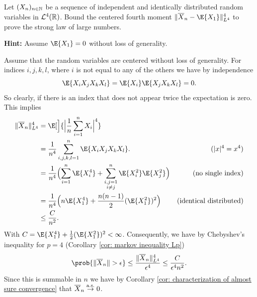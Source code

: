 
\begin{exercise}[subtitle={Strong law of large numbers in \(L^4\) \Coffeecup\Coffeecup}]
    \label{ex: strong law of large numbers in L4}
    Let \((X_n)_{n\in \mathbb{N}}\) be a sequence of independent and identically
    distributed random variables in \(\mathcal{L}^4(\mathbb{R})\). Bound the centered fourth moment
    \(\|\mean{X}_n - \E{X_1}\|_{L^4}^4\) to prove the strong law of large numbers.

    \noindent\textbf{Hint:} Assume \(\E{X_1} = 0\) without loss of generality.
\end{exercise}

\begin{solution}
    Assume that the random variables are centered without loss of generality.
    For indices \(i,j,k,l\), where \(i\) is not equal to any of the others
    we have by independence
    \[
        \E{X_i X_j X_k X_l} = \E{X_i}\E{X_jX_k X_l} = 0.
    \]
    So clearly, if there is an index that does not appear twice the expectation is zero.
    This implies
    \[\begin{aligned}
        \norm{\mean{X}_n}_{L^4}^4
        &= \E[\Big]{\abs[\Big]{\frac1n \sum_{i=1}^n X_i}^4}
        \\
        &= \frac1{n^4} \sum_{i,j,k,l=1}^n \E{X_i X_j X_k X_l}.
        & (\abs{x}^4=x^4)
        \\
        &= \frac1{n^4} \Bigl(
            \sum_{i=1}^n \E{X_i^4}
            + \sum_{\substack{i,j=1\\i\neq j}}^n \E{X_i^2}\E{X_j^2}
        \Bigr)
        & (\text{no single index})
        \\
        &=
        \frac1{n^4}\Bigl(n\E{X_1^4} + \frac{n(n-1)}{2} (\E{X_1^2})^2\Bigr)
        &(\text{identical distributed})
        \\
        &\le \frac{C}{n^2}.
    \end{aligned}
    \]
    With \(C = \E{X_1^4} + \frac12 (\E{X_1^2})^2 < \infty\). Consequently, we have
    by Chebyshev's inequality for \(p=4\) (Corollary \ref{cor: markov inequality Lp})
    \[
        \prob{\norm{\mean{X}_n} > \epsilon} \le \frac{\norm{\mean{X}_n}_{L^4}^4}{\epsilon^4} \le \frac{C}{\epsilon^4 n^2}.
    \]
    Since this is summable in \(n\) we have by Corollary \ref{cor:
    characterization of almost sure convergence} that \(\overline{X}_n
    \overset{\operatorname{\text{a.s.}}}\to 0\).
\end{solution}
